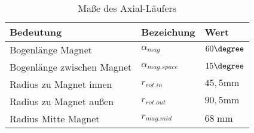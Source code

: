 \begin{table}[h!]

\centering
\caption{Maße des Axial-Läufers}
\label{tab:axial_lauf}
\renewcommand{\arraystretch}{2}
\setlength{\tabcolsep}{7mm}

\begin{tabular}{lll}
    \toprule
     Bedeutung & Bezeichung & Wert\\
    \midrule

	Bogenlänge Magnet&$\alpha_ {mag}$&$60\degree$\\
	Bogenlänge zwischen Magnet&$\alpha_ {mag.space}$& $15 \degree $ \\
	Radius zu Magnet innen&$r_{rot.in} $&$ 45,5 \text{mm}$\\
	Radius zu Magnet außen&$r_{rot.out}$&$ 90,5 \text{mm}$\\
	Radius Mitte Magnet &$r_{mag.mid}$&$68\; \text{mm}$\\

    \bottomrule
  \end{tabular}
\end{table}






